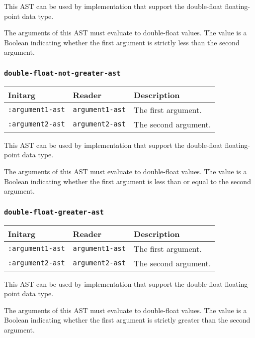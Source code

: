 This AST can be used by implementation that support the double-float
floating-point data type.  

The arguments of this AST must evaluate to double-float
values.  The value is a Boolean indicating whether the first argument
is strictly less than the second argument.

\subsubsection{\texttt{double-float-not-greater-ast}}
\label{sec-ast-double-float-not-greater}

\begin{tabular}{|l|l|l|}
\hline
Initarg & Reader & Description\\
\hline\hline
\texttt{:argument1-ast} & \texttt{argument1-ast} & The first argument.\\
\hline
\texttt{:argument2-ast} & \texttt{argument2-ast} & The second argument.\\
\hline
\end{tabular}

This AST can be used by implementation that support the double-float
floating-point data type.  

The arguments of this AST must evaluate to double-float
values.  The value is a Boolean indicating whether the first argument
is less than or equal to the second argument.

\subsubsection{\texttt{double-float-greater-ast}}
\label{sec-ast-double-float-greater}

\begin{tabular}{|l|l|l|}
\hline
Initarg & Reader & Description\\
\hline\hline
\texttt{:argument1-ast} & \texttt{argument1-ast} & The first argument.\\
\hline
\texttt{:argument2-ast} & \texttt{argument2-ast} & The second argument.\\
\hline
\end{tabular}

This AST can be used by implementation that support the double-float
floating-point data type.  

The arguments of this AST must evaluate to double-float
values.  The value is a Boolean indicating whether the first argument
is strictly greater than the second argument.

